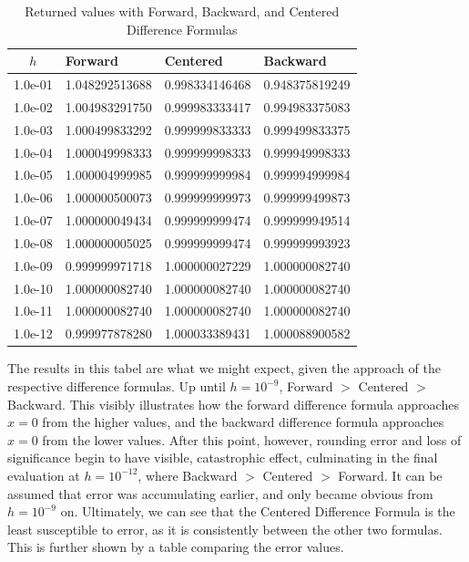 \documentclass{article}
\begin{document}
\begin{table}
\centering
\begin{tabular}{|c|l|l|l|}
\hline
$h$ & Forward & Centered & Backward \\
\hline
1.0e-01 & 1.048292513688 & 0.998334146468 & 0.948375819249 \\
1.0e-02 & 1.004983291750 & 0.999983333417 & 0.994983375083 \\
1.0e-03 & 1.000499833292 & 0.999999833333 & 0.999499833375 \\
1.0e-04 & 1.000049998333 & 0.999999998333 & 0.999949998333 \\
1.0e-05 & 1.000004999985 & 0.999999999984 & 0.999994999984 \\
1.0e-06 & 1.000000500073 & 0.999999999973 & 0.999999499873 \\
1.0e-07 & 1.000000049434 & 0.999999999474 & 0.999999949514 \\
1.0e-08 & 1.000000005025 & 0.999999999474 & 0.999999993923 \\
1.0e-09 & 0.999999971718 & 1.000000027229 & 1.000000082740 \\
1.0e-10 & 1.000000082740 & 1.000000082740 & 1.000000082740 \\
1.0e-11 & 1.000000082740 & 1.000000082740 & 1.000000082740 \\
1.0e-12 & 0.999977878280 & 1.000033389431 & 1.000088900582 \\
\hline
\end{tabular}
\caption{Returned values with Forward, Backward, and Centered Difference Formulas}
\end{table}

The results in this tabel are what we might expect, given the approach of the respective difference formulas. Up until $h=10^{-9}$, Forward 
$>$ Centered $>$ Backward. This visibly illustrates how the forward difference formula approaches $x=0$ from the higher values, and the 
backward difference formula approaches $x=0$ from the lower values. After this point, however, rounding error and loss of significance begin to have 
visible, catastrophic effect, culminating in the final evaluation at $h=10^{-12}$, where Backward $>$ Centered $>$ Forward. It can be assumed 
that error was accumulating earlier, and only became obvious from $h=10^{-9}$ on. Ultimately, we can see that the Centered Difference Formula is the least 
susceptible to error, as it is consistently between the other two formulas. This is further shown by a table comparing the error values.
\end{document}
